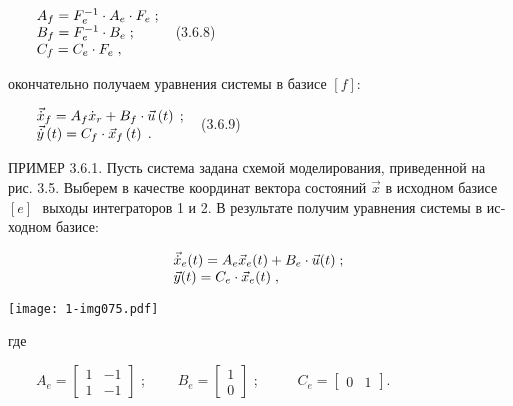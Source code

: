 \documentclass[a4paper]{article}
\begin{document}
{\begin{russian}\sffamily
\ \ \ \  $\begin{matrix}A_f=F_e^{-1}\cdot A_e\cdot F_e\;;\hfill\null \\B_f=F_e^{-1}\cdot B_e\;;\hfill\null
\\C_f=C_e\cdot F_e\;,\hfill\null \end{matrix}\hfill $\ \ (3.6.8)
\end{russian}}

{\begin{russian}\sffamily
окончательно получаем уравнения системы в базисе  $[f]$:
\end{russian}}

{\begin{russian}\sffamily
\ \ \ \  $\begin{matrix}\vec{\dot x}_f=A_f\dot x_r+B_f\cdot \vec u\left(t\right)\;;\hfill\null \\\vec{\dot
y}\left(t\right)=C_f\cdot \vec x_f\left(t\right)\;.\hfill\null \end{matrix}\hfill $\ \ (3.6.9)
\end{russian}}


\bigskip

{\begin{russian}\sffamily
ПРИМЕР 3.6.1. Пусть система задана схемой моделирования, приведенной на рис. 3.5. Выберем в качестве координат вектора
состояний  $\vec x$ в исходном базисе  $[e]$ $ $ выходы интеграторов 1 и 2. В результате получим уравнения системы в
исходном базисе:
\end{russian}}

\begin{equation*}
\begin{matrix}\vec{\dot x}_e(t)=A_e\vec x_e(t)+B_e\cdot \vec u(t)\;;\hfill\null \\\vec y(t)=C_e\cdot \vec
x_e(t)\;,\hfill\null \end{matrix}\hfill 
\end{equation*}

\bigskip


\bigskip

{\centering  \texttt{[image: 1-img075.pdf]} \par}

\bigskip

{\begin{russian}\sffamily
где
\end{russian}}

{\begin{russian}\sffamily
\ \ \ \  $A_e=\left[\begin{matrix}1&-1\\1&-1\end{matrix}\right]$ ; \ \ \ \ 
$B_e=\left[\begin{matrix}1\\0\end{matrix}\right]$ ; \ \ \ \ \  $C_e=\left[\begin{matrix}0&1\end{matrix}\right]$.
\end{russian}}
\end{document}
